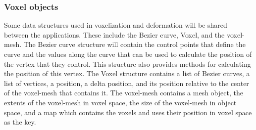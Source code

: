 \subsubsection{Voxel objects} \label{VoxelObjects}

Some data structures used in voxelization and deformation will be shared between the applications.
These include the Bezier curve, Voxel, and the voxel-mesh. The Bezier curve structure will contain
the control points that define the curve and the values along the curve that can be used to 
calculate the position of the vertex that they control. This structure also provides methods for
calculating the position of this vertex. The Voxel structure contains a list of Bezier curves, a 
list of vertices, a position, a delta position, and its position relative to the center of the 
voxel-mesh that contains it. The voxel-mesh contains a mesh object, the extents of the voxel-mesh 
in voxel space, the size of the voxel-mesh in object space, and a map which contains the voxels and
uses their position in voxel space as the key.